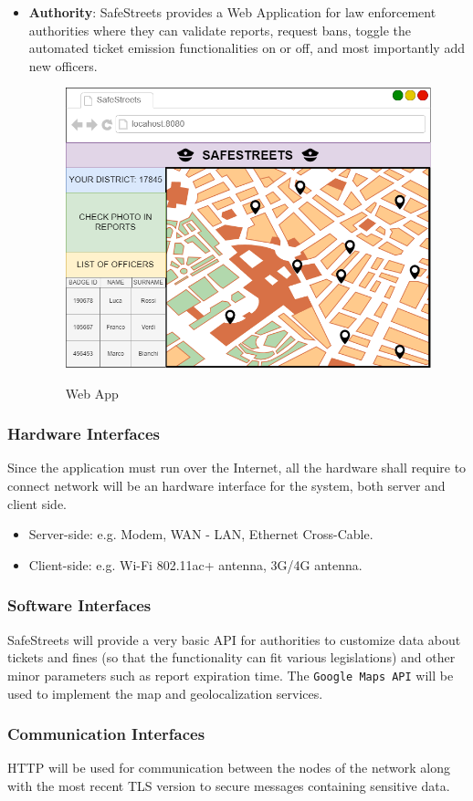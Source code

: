 \documentclass[12pt,a4paper]{article}
\begin{document}
\begin {itemize}
\begin{figure}[H]
			\caption{Investigation}
		\end{figure}
	\item \textbf{Authority}: SafeStreets provides a Web Application for law enforcement authorities where they can validate reports, request bans, toggle the automated ticket emission functionalities on or off, and most importantly add new officers.
		\begin{figure}[H]
			\centering
			{\includegraphics[width=1\linewidth, height=.5\linewidth]{Images/Mockup/AuthorityWebApp.png}}
			\caption{Web App}
		\end{figure}
\end{itemize}
\subsubsection{Hardware	Interfaces}
Since the application must run over the Internet, all the hardware shall require to connect network will be an hardware interface for the system, both
server and client side.
\begin{itemize}
\item Server-side: e.g. Modem, WAN - LAN, Ethernet Cross-Cable.
\item Client-side: e.g. Wi-Fi 802.11ac+ antenna, 3G/4G antenna. 
\end{itemize}
\subsubsection{Software	Interfaces}
SafeStreets will provide a very basic API for authorities to customize data about tickets and fines (so that the functionality can fit various legislations) and other minor parameters such as report expiration time.
The \texttt{Google Maps API} will be used to implement the map and geolocalization services.
\subsubsection{Communication	Interfaces}
HTTP will be used for communication between the nodes of the network along with the most recent TLS version to secure messages containing sensitive data. 
\end{document}
